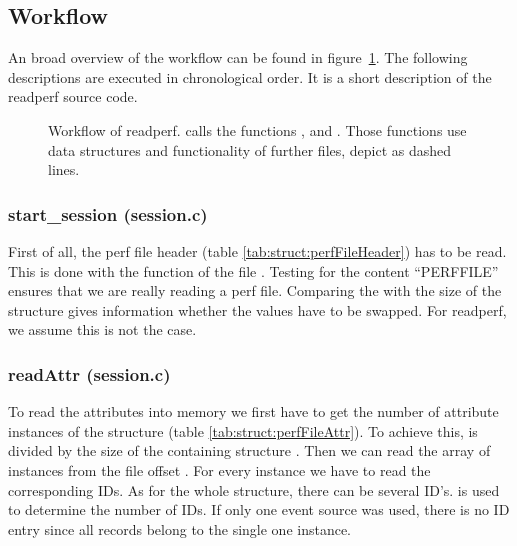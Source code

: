 \newcommand{\funcdesc}[2]{\subsubsection{#2 (#1)}}
\subsection{Workflow}
An broad overview of the workflow can be found in figure~\ref{fig:readperfWorkflow}. The following descriptions are executed in chronological order. It is a short description of the readperf source code.

\begin{figure}[ht]
  \centering
  
  \caption[Workflow of readperf]{Workflow of readperf.  calls the functions ,  and . Those functions use data structures and functionality of further files, depict as dashed lines.\label{fig:readperfWorkflow}}
\end{figure}

\funcdesc{session.c}{start\_session}
First of all, the perf file header (table \ref{tab:struct:perfFileHeader}) has to be read. This is done with the function  of the file . Testing  for the content ``PERFFILE'' ensures that we are really reading a perf file. Comparing the  with the size of the structure  gives information whether the values have to be swapped. For readperf, we assume this is not the case.

\funcdesc{session.c}{readAttr}
To read the attributes into memory we first have to get the number of attribute instances of the structure  (table \ref{tab:struct:perfFileAttr}). To achieve this,  is divided by the size of the containing structure . Then we can read the array of instances from the file offset . For every instance we have to read the corresponding IDs. As for the whole structure, there can be several ID's.  is used to determine the number of IDs. If only one event source was used, there is no ID entry since all records belong to the single one  instance.

